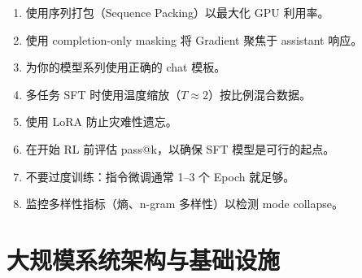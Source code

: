 \begin{keybox}
\begin{enumerate}
  \item 使用序列打包（Sequence Packing）以最大化 GPU 利用率。
  \item 使用 completion-only masking 将 Gradient 聚焦于 assistant 响应。
  \item 为你的模型系列使用正确的 chat 模板。
  \item 多任务 SFT 时使用温度缩放（$T \approx 2$）按比例混合数据。
  \item 使用 LoRA 防止灾难性遗忘。
  \item 在开始 RL 前评估 pass@k，以确保 SFT 模型是可行的起点。
  \item 不要过度训练：指令微调通常 1--3 个 Epoch 就足够。
  \item 监控多样性指标（熵、n-gram 多样性）以检测 mode collapse。
\end{enumerate}
\end{keybox}

\chapter{大规模系统架构与基础设施}
\label{system-architecture-infrastructure-at-scale}

